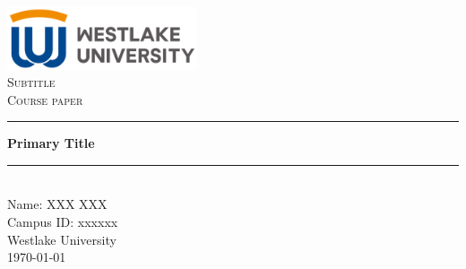 \documentclass[11pt,a4paper]{article}
\newcommand{\HRule}[1]{\rule{\linewidth}{#1}}
\newcommand{\name}{XXX XXX}
\newcommand{\ID}{xxxxxx}
\newcommand{\school}{Westlake University}
\begin{document}
\begin{titlepage}
    \centering
    \includegraphics[width=0.42\textwidth]{figures/logo.png}                
    \\ [2.5cm]
    \large \textsc{Subtitle \\ Course paper} 
                        \\ [2.5cm]
    \HRule{0.5pt} 
    \LARGE \textbf{Primary Title}	%
    \HRule{2pt}         \\ [2.5cm]		

    \large 
    Name: \name         \\ [10pt]
    Campus ID: \ID      \\ [10pt]
    \school             \\ [10pt]		
    \normalsize \today  \\ [10pt]
\end{titlepage}


\newpage

\end{document}
